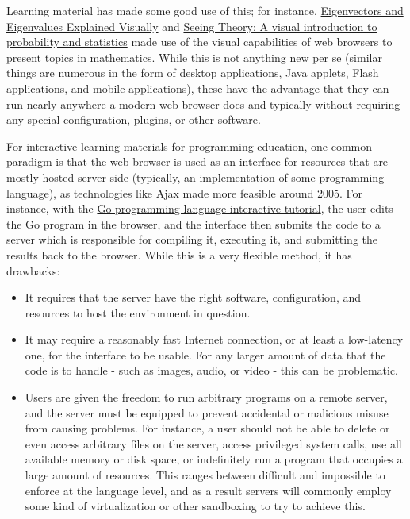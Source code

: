 \documentclass{sig-alternate-05-2015}
\begin{document}
Learning material has made some good use of this; for instance,
\href{http://setosa.io/ev/eigenvectors-and-eigenvalues/}{Eigenvectors
  and Eigenvalues Explained Visually} and
\href{http://students.brown.edu/seeing-theory/index.html}{Seeing
  Theory: A visual introduction to probability and statistics} made
use of the visual capabilities of web browsers to present topics in
mathematics.  While this is not anything new per se (similar things
are numerous in the form of desktop applications, Java applets, Flash
applications, and mobile applications), these have the advantage that
they can run nearly anywhere a modern web browser does and typically
without requiring any special configuration, plugins, or other
software.

For interactive learning materials for programming education, one
common paradigm is that the web browser is used as an interface for
resources that are mostly hosted server-side (typically, an
implementation of some programming language), as technologies like
Ajax made more feasible around 2005\cite{Ajax}. For instance, with the
\href{https://golang.org/}{Go programming language interactive
  tutorial}, the user edits the Go program in the browser, and the
interface then submits the code to a server which is responsible for
compiling it, executing it, and submitting the results back to the
browser.  While this is a very flexible method, it has drawbacks:

\begin{itemize}
\item It requires that the server have the right software,
  configuration, and resources to host the environment in question.
\item It may require a reasonably fast Internet connection, or at
  least a low-latency one, for the interface to be usable.  For any
  larger amount of data that the code is to handle - such as images,
  audio, or video - this can be problematic.
\item Users are given the freedom to run arbitrary programs on a
  remote server, and the server must be equipped to prevent accidental
  or malicious misuse from causing problems.  For instance, a user
  should not be able to delete or even access arbitrary files on the
  server, access privileged system calls, use all available memory or
  disk space, or indefinitely run a program that occupies a large
  amount of resources.  This ranges between difficult and impossible
  to enforce at the language level, and as a result servers will
  commonly employ some kind of virtualization or other sandboxing to
  try to achieve this.
\end{itemize}
\end{document}
